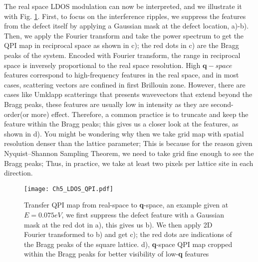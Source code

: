 The real space \ac{LDOS} modulation can now be interpreted, and we illustrate it with Fig. \ref{fig:ch5_ldos}. First, to focus on the interference ripples, we suppress the features from the defect itself by applying a Gaussian mask at the defect location, a)-b). Then, we apply the Fourier transform and take the power spectrum to get the \ac{QPI} map in reciprocal space as shown in c); the red dots in c) are the Bragg peaks of the system. Encoded with Fourier transform, the range in reciprocal space is inversely proportional to the real space resolution. High $\textbf{q}-space$ features correspond to high-frequency features in the real space, and in most cases, scattering vectors are confined in first Brillouin zone. However, there are cases like Umklapp scatterings that presents wavevectors that extend beyond the Bragg peaks, these features are usually low in intensity as they are second-order(or more) effect. Therefore, a common practice is to truncate and keep the feature within the Bragg peaks; this gives us a closer look at the features, as shown in d). You might be wondering why then we take grid map with spatial resolution denser than the lattice parameter; This is because for the reason given Nyquist–Shannon Sampling Theorem, we need to take grid fine enough to see the Bragg peaks; Thus, in practice, we take at least two pixels per lattice site in each direction.  
\begin{figure}
	\centering
	\texttt{[image: Ch5\_LDOS\_QPI.pdf]} 
	\caption{Transfer QPI map from real-space to \textbf{q}-space, an example given at $E=0.075eV$, we first suppress the defect feature with a Gaussian mask at the red dot in a), this gives us b). We then apply 2D Fourier transformed to b) and get c); the red dots are indications of the Bragg peaks of the square lattice. d), \textbf{q}-space QPI map cropped within the Bragg peaks for better visibility of low-\textbf{q} features}
	\label{fig:ch5_ldos}
\end{figure}

